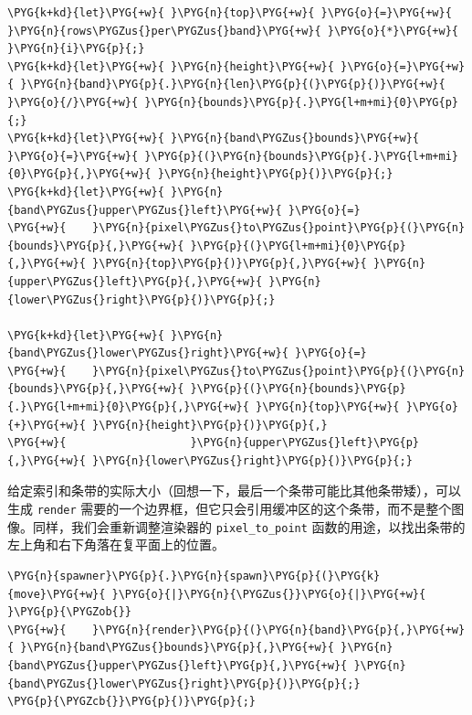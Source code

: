 \begin{Verbatim}[commandchars=\\\{\},breaklines=true,breakanywhere=true,fontsize=\codefont,xleftmargin=17bp]
\PYG{k+kd}{let}\PYG{+w}{ }\PYG{n}{top}\PYG{+w}{ }\PYG{o}{=}\PYG{+w}{ }\PYG{n}{rows\PYGZus{}per\PYGZus{}band}\PYG{+w}{ }\PYG{o}{*}\PYG{+w}{ }\PYG{n}{i}\PYG{p}{;}
\PYG{k+kd}{let}\PYG{+w}{ }\PYG{n}{height}\PYG{+w}{ }\PYG{o}{=}\PYG{+w}{ }\PYG{n}{band}\PYG{p}{.}\PYG{n}{len}\PYG{p}{(}\PYG{p}{)}\PYG{+w}{ }\PYG{o}{/}\PYG{+w}{ }\PYG{n}{bounds}\PYG{p}{.}\PYG{l+m+mi}{0}\PYG{p}{;}
\PYG{k+kd}{let}\PYG{+w}{ }\PYG{n}{band\PYGZus{}bounds}\PYG{+w}{ }\PYG{o}{=}\PYG{+w}{ }\PYG{p}{(}\PYG{n}{bounds}\PYG{p}{.}\PYG{l+m+mi}{0}\PYG{p}{,}\PYG{+w}{ }\PYG{n}{height}\PYG{p}{)}\PYG{p}{;}
\PYG{k+kd}{let}\PYG{+w}{ }\PYG{n}{band\PYGZus{}upper\PYGZus{}left}\PYG{+w}{ }\PYG{o}{=}
\PYG{+w}{    }\PYG{n}{pixel\PYGZus{}to\PYGZus{}point}\PYG{p}{(}\PYG{n}{bounds}\PYG{p}{,}\PYG{+w}{ }\PYG{p}{(}\PYG{l+m+mi}{0}\PYG{p}{,}\PYG{+w}{ }\PYG{n}{top}\PYG{p}{)}\PYG{p}{,}\PYG{+w}{ }\PYG{n}{upper\PYGZus{}left}\PYG{p}{,}\PYG{+w}{ }\PYG{n}{lower\PYGZus{}right}\PYG{p}{)}\PYG{p}{;}

\PYG{k+kd}{let}\PYG{+w}{ }\PYG{n}{band\PYGZus{}lower\PYGZus{}right}\PYG{+w}{ }\PYG{o}{=}
\PYG{+w}{    }\PYG{n}{pixel\PYGZus{}to\PYGZus{}point}\PYG{p}{(}\PYG{n}{bounds}\PYG{p}{,}\PYG{+w}{ }\PYG{p}{(}\PYG{n}{bounds}\PYG{p}{.}\PYG{l+m+mi}{0}\PYG{p}{,}\PYG{+w}{ }\PYG{n}{top}\PYG{+w}{ }\PYG{o}{+}\PYG{+w}{ }\PYG{n}{height}\PYG{p}{)}\PYG{p}{,}
\PYG{+w}{                   }\PYG{n}{upper\PYGZus{}left}\PYG{p}{,}\PYG{+w}{ }\PYG{n}{lower\PYGZus{}right}\PYG{p}{)}\PYG{p}{;}
\end{Verbatim}

给定索引和条带的实际大小（回想一下，最后一个条带可能比其他条带矮），可以生成 \texttt{render} 需要的一个边界框，但它只会引用缓冲区的这个条带，而不是整个图像。同样，我们会重新调整渲染器的 \texttt{pixel\_to\_point} 函数的用途，以找出条带的左上角和右下角落在复平面上的位置。

\begin{Verbatim}[commandchars=\\\{\},breaklines=true,breakanywhere=true,fontsize=\codefont,xleftmargin=17bp]
\PYG{n}{spawner}\PYG{p}{.}\PYG{n}{spawn}\PYG{p}{(}\PYG{k}{move}\PYG{+w}{ }\PYG{o}{|}\PYG{n}{\PYGZus{}}\PYG{o}{|}\PYG{+w}{ }\PYG{p}{\PYGZob{}}
\PYG{+w}{    }\PYG{n}{render}\PYG{p}{(}\PYG{n}{band}\PYG{p}{,}\PYG{+w}{ }\PYG{n}{band\PYGZus{}bounds}\PYG{p}{,}\PYG{+w}{ }\PYG{n}{band\PYGZus{}upper\PYGZus{}left}\PYG{p}{,}\PYG{+w}{ }\PYG{n}{band\PYGZus{}lower\PYGZus{}right}\PYG{p}{)}\PYG{p}{;}
\PYG{p}{\PYGZcb{}}\PYG{p}{)}\PYG{p}{;}
\end{Verbatim}

